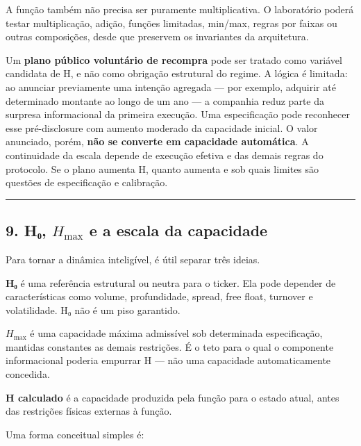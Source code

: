 \documentclass[
  a4paper,
]{article}
\begin{document}
A função também não precisa ser puramente multiplicativa. O laboratório
poderá testar multiplicação, adição, funções limitadas, min/max, regras
por faixas ou outras composições, desde que preservem os invariantes da
arquitetura.

Um \textbf{plano público voluntário de recompra} pode ser tratado como
variável candidata de H, e não como obrigação estrutural do regime. A
lógica é limitada: ao anunciar previamente uma intenção agregada --- por
exemplo, adquirir até determinado montante ao longo de um ano --- a
companhia reduz parte da surpresa informacional da primeira execução.
Uma especificação pode reconhecer esse pré-disclosure com aumento
moderado da capacidade inicial. O valor anunciado, porém, \textbf{não se
converte em capacidade automática}. A continuidade da escala depende de
execução efetiva e das demais regras do protocolo. Se o plano aumenta H,
quanto aumenta e sob quais limites são questões de especificação e
calibração.

\begin{center}\rule{0.5\linewidth}{0.5pt}\end{center}

\hypertarget{9-h0-hmax-e-a-escala-da-capacidade}{}

\hypertarget{9-hux2080-h_max-e-a-escala-da-capacidade}{%
\subsection{\texorpdfstring{9. H₀, \(H_{\max}\) e a escala da
capacidade}{9. H₀, H\_\{\textbackslash max\} e a escala da capacidade}}\label{9-hux2080-h_max-e-a-escala-da-capacidade}}

Para tornar a dinâmica inteligível, é útil separar três ideias.

\textbf{H₀} é uma referência estrutural ou neutra para o ticker. Ela
pode depender de características como volume, profundidade, spread, free
float, turnover e volatilidade. H₀ não é um piso garantido.

\textbf{\(H_{\max}\)} é uma capacidade máxima admissível sob determinada
especificação, mantidas constantes as demais restrições. É o teto para o
qual o componente informacional poderia empurrar H --- não uma
capacidade automaticamente concedida.

\textbf{H calculado} é a capacidade produzida pela função para o estado
atual, antes das restrições físicas externas à função.

Uma forma conceitual simples é:
\end{document}
